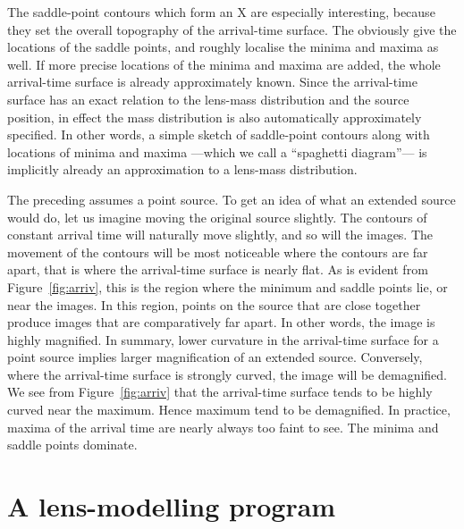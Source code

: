 \documentclass[usenatbib]{mn2e}
\newcommand{\figref}[1]{Figure~\ref{fig:#1}}
\begin{document}
The saddle-point contours which form an X are especially interesting,
because they set the overall topography of the arrival-time surface.
The obviously give the locations of the saddle points, and roughly
localise the minima and maxima as well.  If more precise locations of
the minima and maxima are added, the whole arrival-time surface is
already approximately known.  Since the arrival-time surface has an
exact relation to the lens-mass distribution and the source position,
in effect the mass distribution is also automatically approximately
specified.  In other words, a simple sketch of saddle-point contours
along with locations of minima and maxima ---which we call a
``spaghetti diagram''--- is implicitly already an approximation to a
lens-mass distribution.

The preceding assumes a point source.  To get an idea of what an
extended source would do, let us imagine moving the original source
slightly.  The contours of constant arrival time will naturally move
slightly, and so will the images.  The movement of the contours will
be most noticeable where the contours are far apart, that is where the
arrival-time surface is nearly flat.  As is evident from
\figref{arriv}, this is the region where the minimum and saddle points
lie, or near the images.  In this region, points on the source that
are close together produce images that are comparatively far apart.
In other words, the image is highly magnified.  In summary, lower
curvature in the arrival-time surface for a point source implies
larger magnification of an extended source.  Conversely, where the
arrival-time surface is strongly curved, the image will be
demagnified.  We see from \figref{arriv} that the arrival-time surface
tends to be highly curved near the maximum.  Hence maximum tend to be
demagnified.  In practice, maxima of the arrival time are nearly
always too faint to see. The minima and saddle points dominate.



\section{A lens-modelling program} 
\label{sec:SpaghettiLens}
\end{document}
